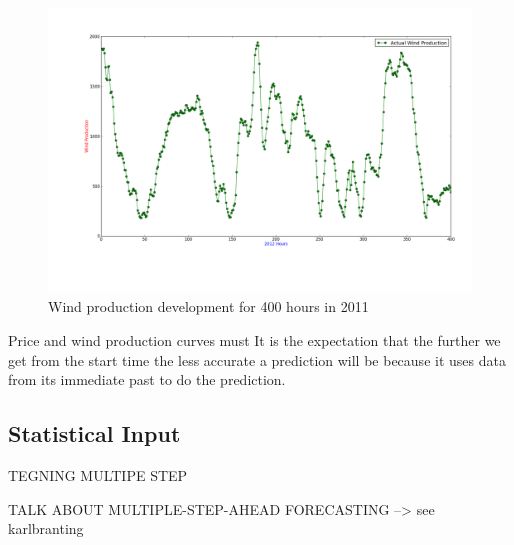 \begin{figure}[H]
\centering
\includegraphics[width=0.99\linewidth,natwidth=898,natheight=587]{billeder/productionTendency400Hours.png}
\caption{Wind production development for 400 hours in 2011}
\label{fig:windHourDevelopment400Hours}
\end{figure}


Price and wind production curves must 
It is the expectation that the further we get from the start time the less accurate a prediction will be because it uses data from its immediate past to do the prediction. 


\subsection{Statistical Input}

TEGNING MULTIPE STEP

TALK ABOUT MULTIPLE-STEP-AHEAD FORECASTING --> see karlbranting